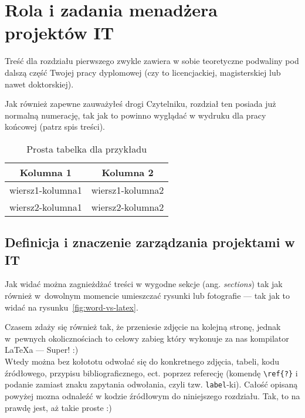 \chapter{Rola i zadania menadżera projektów IT}
\label{chap:teoretyczne_podwaliny}

Treść dla rozdziału pierwszego zwykle zawiera w sobie teoretyczne podwaliny pod dalszą część Twojej pracy dyplomowej (czy to licencjackiej, magisterskiej lub nawet doktorskiej). 

Jak również zapewne zauważyłeś drogi Czytelniku, rozdział ten posiada już normalną numerację, tak jak to powinno wyglądać w wydruku dla pracy końcowej (patrz spis treści).

\begin{table}[!h]
    \centering
    \begin{tabular}{|c|c|}
    \hline
    \textbf{Kolumna 1} & \textbf{Kolumna 2} \\ \hline \hline
    wiersz1-kolumna1 & wiersz1-kolumna2 \\ \hline
    wiersz2-kolumna1 & wiersz2-kolumna2 \\ \hline
    \end{tabular}
\caption{Prosta tabelka dla przykładu}
\label{tab:tab:prosta-tabela-przyklad-A}
\end{table}


\section{Definicja i znaczenie zarządzania projektami w IT}
Jak widać można zagnieżdżać treści w wygodne sekcje (ang. \textit{sections}) tak jak również w~dowolnym momencie umieszczać rysunki lub fotografie --- tak jak to widać na rysunku~\ref{fig:word-vs-latex}.


Czasem zdaży się również tak, że przeniesie zdjęcie na kolejną stronę, jednak w~pewnych okolicznościach to celowy zabieg który wykonuje za nas kompilator LaTeXa --- Super! :) \\
Wtedy można bez kołototu odwołać się do konkretnego zdjęcia, tabeli, kodu źródłowego, przypisu bibliograficznego, ect. poprzez referecję (komendę \texttt{\textbackslash{}ref\{?\}} i podanie zamiast znaku zapytania odwołania, czyli tzw. \texttt{label}-ki). Całość opisaną powyżej mozna odnaleźć w kodzie źródłowym do niniejszego rozdziału. Tak, to na prawdę jest, aż takie proste :)

